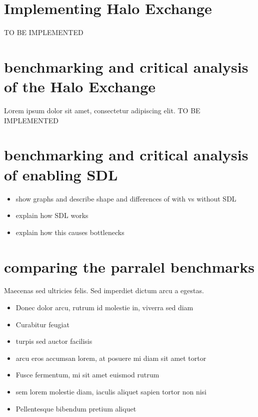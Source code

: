 \documentclass[twoside,twocolumn]{article}
\begin{document}
\section{Implementing Halo Exchange}

TO BE IMPLEMENTED

\section{benchmarking and critical analysis of the Halo Exchange}

\lettrine[nindent=0em,lines=3]{L} orem ipsum dolor sit amet, consectetur adipiscing elit.
TO BE IMPLEMENTED

\section{benchmarking and critical analysis of enabling SDL}

\begin{itemize}
  \item show graphs and describe shape and differences of with vs without SDL
  \item explain how SDL works
  \item explain how this causes bottlenecks
\end{itemize}

\section{comparing the parralel benchmarks}

Maecenas sed ultricies felis. Sed imperdiet dictum arcu a egestas. 
\begin{itemize}
\item Donec dolor arcu, rutrum id molestie in, viverra sed diam
\item Curabitur feugiat
\item turpis sed auctor facilisis
\item arcu eros accumsan lorem, at posuere mi diam sit amet tortor
\item Fusce fermentum, mi sit amet euismod rutrum
\item sem lorem molestie diam, iaculis aliquet sapien tortor non nisi
\item Pellentesque bibendum pretium aliquet
\end{itemize}
\blindtext %
\end{document}
